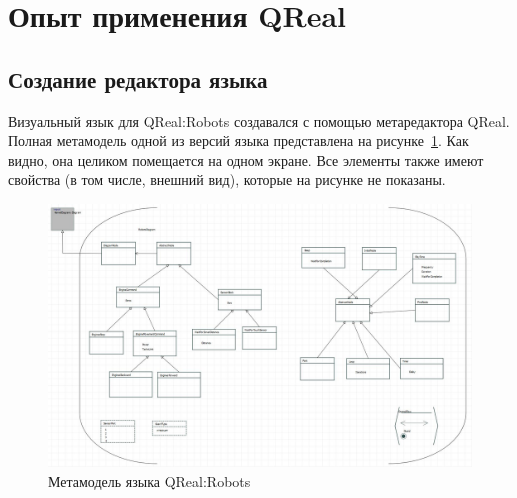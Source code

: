 \documentclass[a4paper]{article}
\begin{document}
\section{Опыт применения QReal}
\subsection{Создание редактора языка}
Визуальный язык для QReal:Robots создавался с помощью метаредактора QReal. Полная метамодель одной из версий языка представлена на рисунке~\ref{robotsMetamodel}. Как видно, она целиком помещается на одном экране. Все элементы также имеют свойства (в том числе, внешний вид), которые на рисунке не показаны.

\begin{figure} [ht]
  \begin{center}
    \includegraphics[width=\textwidth]{robotsMetamodel.jpg}
    \caption{Метамодель языка QReal:Robots}
    \label{robotsMetamodel}
  \end{center}
\end{figure}
\end{document}
